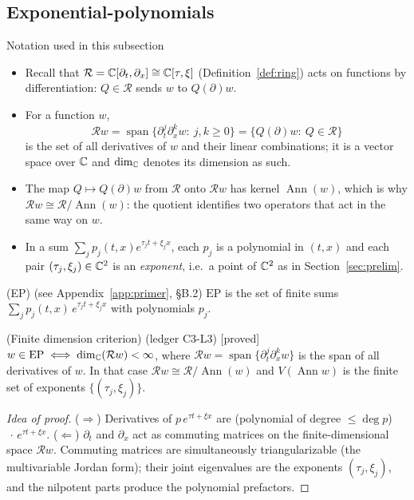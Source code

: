 \documentclass[11pt,a4paper]{article}
\theoremstyle{definition}
\newcommand{\badge}[2]{\textcolor{#1}{\textsf{\footnotesize[#2]}}}
\newcommand{\proved}[1][]{\badge{cC}{proved#1}}
\newcommand{\led}[1]{\textcolor{cG}{\textsf{\footnotesize(ledger #1)}}}
\newcommand{\Ann}{\operatorname{Ann}}
\newcommand{\EP}{\mathrm{EP}}
\newcommand{\ring}{\mathcal{R}}
\newcommand{\Var}{V}
\DeclareMathOperator{\spn}{span}
\DeclareMathOperator{\dimc}{dim}
\begin{document}


\subsection{Exponential-polynomials}
\begin{notebox}{Notation used in this subsection}
\begin{itemize}[nosep]
\item Recall that $\ring=\C[\partial_t,\partial_x]\cong\C[\tau,\xi]$ (Definition~\ref{def:ring}) acts on functions by differentiation: $Q\in\ring$ sends $w$ to $Q(\partial)w$.
\item For a function $w$,
\[
\ring w=\spn\{\partial_t^j\partial_x^kw:\ j,k\ge0\}=\{Q(\partial)w:\ Q\in\ring\}
\]
is the set of all derivatives of $w$ and their linear combinations; it is a vector space over $\mathbb{C}$ and $\dimc_\C$ denotes its dimension as such.
\item The map $Q\mapsto Q(\partial)w$ from $\ring$ onto $\ring w$ has kernel $\Ann(w)$, which is why $\ring w\cong\ring/\Ann(w)$: the quotient identifies two operators that act in the same way on $w$.
\item In a sum $\sum_jp_j(t,x)e^{\tau_jt+\xi_jx}$, each $p_j$ is a polynomial in $(t,x)$ and each pair $(\tau_j,\xi_j)\in\mathbb{C}^2$ is an \emph{exponent}, i.e.\ a point of $\mathbb{C}^2$ as in Section~\ref{sec:prelim}.
\end{itemize}
\end{notebox}
\begin{definition}{(EP) \textcolor{cG}{\textsf{\footnotesize(see Appendix~\ref{app:primer}, \S B.2)}}}\label{def:ep}
$\EP$ is the set of finite sums $\sum_jp_j(t,x)\,e^{\tau_jt+\xi_jx}$ with polynomials $p_j$.
\end{definition}
\begin{lemma}{(Finite dimension criterion) \led{C3-L3} \proved[]}\label{lem:ep}
$w\in\EP\iff\dimc_\C(\ring w)<\infty$, where $\ring w=\spn\{\partial_t^j\partial_x^kw\}$ is the span of all derivatives of $w$. In that case $\ring w\cong\ring/\Ann(w)$ and $\Var(\Ann w)$ is the finite set of exponents $\{(\tau_j,\xi_j)\}$.
\end{lemma}
\begin{proof}[Idea of proof]
($\Rightarrow$) Derivatives of $p\,e^{\tau t+\xi x}$ are (polynomial of degree $\le\deg p$)$\,\cdot\,e^{\tau t+\xi x}$.
($\Leftarrow$) $\partial_t$ and $\partial_x$ act as commuting matrices on the finite-dimensional space $\ring w$. Commuting matrices are simultaneously triangularizable (the multivariable Jordan form); their joint eigenvalues are the exponents $(\tau_j,\xi_j)$, and the nilpotent parts produce the polynomial prefactors.
\end{proof}
\end{document}
